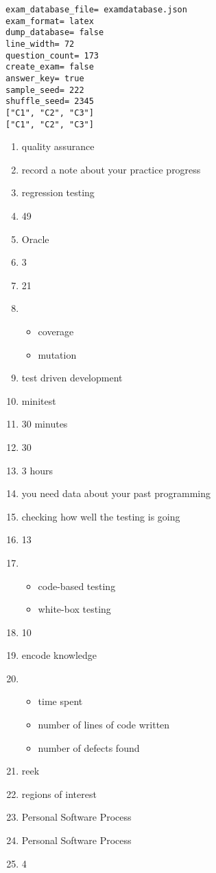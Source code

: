\documentclass{exam}
\begin{document}
\newpage
\begin{verbatim}
exam_database_file= examdatabase.json
exam_format= latex
dump_database= false
line_width= 72
question_count= 173
create_exam= false
answer_key= true
sample_seed= 222
shuffle_seed= 2345
["C1", "C2", "C3"]
["C1", "C2", "C3"]
\end{verbatim}
\begin{enumerate}
\item quality assurance
\item record a note about your practice progress
\item regression testing
\item 49
\item Oracle
\item 3
\item 21
\item \begin{itemize}
\item coverage
\item mutation
\end{itemize}
\item test driven development
\item minitest
\item 30 minutes
\item 30
\item 3 hours
\item you need data about your past programming
\item checking how well the testing is going
\item 13
\item \begin{itemize}
\item code-based testing
\item white-box testing
\end{itemize}
\item 10
\item encode knowledge
\item \begin{itemize}
\item time spent
\item number of lines of code written
\item number of defects found
\end{itemize}
\item reek
\item regions of interest
\item Personal Software Process
\item Personal Software Process
\item 4
\end{enumerate}
\end{document}
